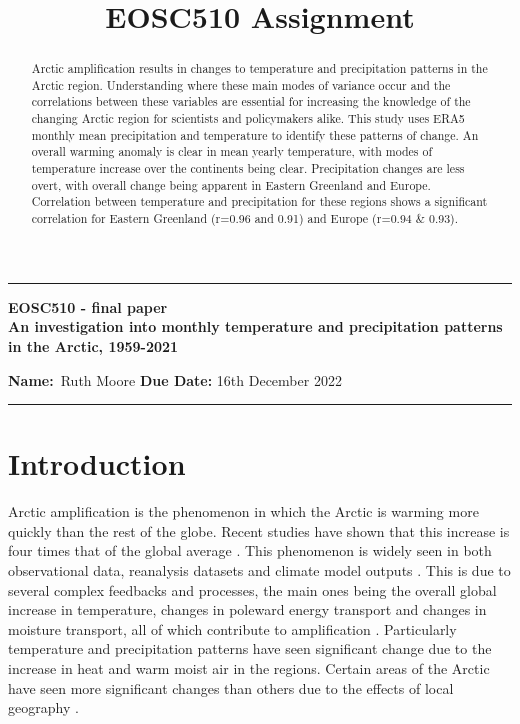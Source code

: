 \documentclass[11pt, oneside]{article}
\title{EOSC510 Assignment }
\begin{document}
\begin{center}
	\hrule
	\vspace{.4cm}
	{\textbf { \large EOSC510 - final paper \\ An investigation into monthly temperature
and precipitation patterns in the Arctic, 1959-2021}}
\end{center}
{\textbf{Name:}\ Ruth Moore \hspace{\fill} }\textbf{Due Date:} 16th December 2022   \\
	\hrule


\hfill
\hfill
 \hfill
\hfill

\begin{abstract}
  Arctic amplification results in changes to temperature and precipitation patterns in the Arctic region. Understanding where these main modes of variance occur and the correlations between these variables are essential for increasing the knowledge of the changing Arctic region for scientists and policymakers alike. This study uses ERA5 monthly mean precipitation and temperature to identify these patterns of change. An overall warming anomaly is clear in mean yearly temperature, with modes of temperature increase over the continents being clear. Precipitation changes are less overt, with overall change being apparent in Eastern Greenland and Europe. Correlation between temperature and precipitation for these regions shows a significant correlation for Eastern Greenland (r=0.96 and 0.91) and Europe (r=0.94 \& 0.93).
   \end{abstract}
\section{Introduction}

Arctic amplification is the phenomenon in which the Arctic is warming more quickly than the rest of the globe. Recent studies have shown that this increase is four times that of the global average \cite{rantanen2022arctic}. This phenomenon is widely seen in both observational data, reanalysis datasets and climate model outputs \cite{chylek2022annual}.  This is due to several complex feedbacks and processes, the main ones being the overall global increase in temperature, changes in poleward energy transport and changes in moisture transport, all of which contribute to amplification \cite{serreze2011processes}. Particularly temperature and precipitation patterns have seen significant change due to the increase in heat and warm moist air in the regions. Certain areas of the Arctic have seen more significant changes than others due to the effects of local geography \cite{stuecker2018polar}.
 
\end{document}

